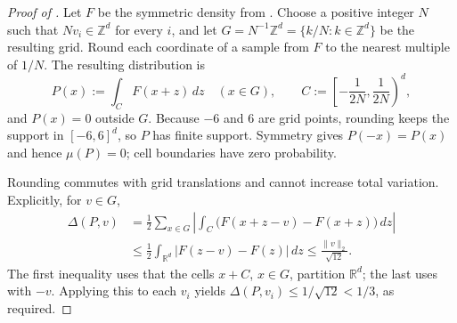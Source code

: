 \documentclass{article}
\newcommand{\R}{\mathbb{R}}
\newcommand{\SDS}[2]{\Delta(#1,#2)}
\begin{document}
\begin{proof}[Proof of ]
Let $F$ be the symmetric density from .
Choose a positive integer $N$ such that $Nv_i\in\mathbb{Z}^d$
for every $i$, and let
$G=N^{-1}\mathbb{Z}^d=\{k/N:k\in\mathbb{Z}^d\}$ be the resulting grid.
Round each coordinate of a sample from $F$ to the nearest multiple
of $1/N$. The resulting distribution is
\[
P(x):=\int_C F(x+z)\,dz
\quad (x\in G),
\qquad
C:=\left[-\frac1{2N},\frac1{2N}\right)^d,
\]
and $P(x)=0$ outside $G$. Because $-6$ and $6$ are grid points,
rounding keeps the support in $[-6,6]^d$, so $P$ has finite
support. Symmetry gives $P(-x)=P(x)$ and hence $\mu(P)=0$;
cell boundaries have zero probability.

Rounding commutes with grid translations and cannot increase
total variation. Explicitly, for $v\in G$,
\[
\begin{aligned}
\SDS{P}{v}
&=\frac12\sum_{x\in G}
\left|\int_C\bigl(F(x+z-v)-F(x+z)\bigr)\,dz\right|\\
&\le\frac12\int_{\R^d}|F(z-v)-F(z)|\,dz
\le\frac{\|v\|_2}{\sqrt{12}}.
\end{aligned}
\]
The first inequality uses that the cells $x+C$, $x\in G$, partition
$\R^d$; the last uses  with $-v$.
Applying this to each $v_i$ yields
$\SDS{P}{v_i}\le1/\sqrt{12}<1/3$, as required.
\end{proof}



\end{document}

